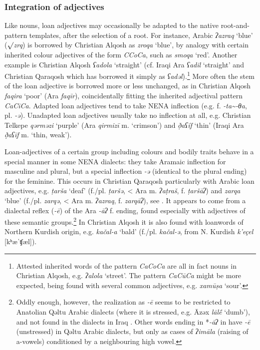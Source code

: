\documentclass[output=paper]{langsci/langscibook}
\begin{document}
\subsubsection{Integration of adjectives}

Like nouns, loan adjectives may occasionally be adapted to the native root-and-pattern templates, after the selection of a root. For instance, Arabic \textit{ʔazraq} ‘blue’ (${\surd}$\textit{zrq}) is borrowed by Christian Alqosh as \textit{zroqa} ‘blue’, by analogy with certain inherited colour adjectives of the form \textit{CCoCa}, such as \textit{smoqa} ‘red’. Another example is Christian Alqosh \textit{ʕadola} ‘straight’ (cf. Iraqi Ara \textit{ʕadil} ‘straight’ and Christian Qaraqosh which has borrowed it simply as \textit{ʕadəl}).\footnote{Attested inherited words of the pattern \textit{CaCoCa} are all in fact nouns in Christian Alqosh, e.g. \textit{ʔalola} ‘street’. The pattern \textit{CaCūCa} might be more expected, being found with several common adjectives, e.g. \textit{xamūṣa} ‘sour’.} More often the stem of the loan adjective is borrowed more or less unchanged, as in Christian Alqosh \textit{faqira} ‘poor’ (Ara \textit{faqīr}), coincidentally fitting the inherited adjectival pattern \textit{CaCīCa}. Adapted loan adjectives tend to take NENA inflection (e.g. f. \textit{{}-ta{\textasciitilde}-θa}, pl. \textit{{}-ə}). Unadapted loan adjectives usually take no inflection at all, e.g. Christian Telkepe \textit{qərməzi} ‘purple’ (Ara \textit{qirmizī} m. ‘crimson’) and \textit{ð̣aʕíf} ‘thin’ (Iraqi Ara \textit{ð̣aʕīf} m. ‘thin, weak’).

Loan-adjectives of a certain group including colours and bodily traits behave in a special manner in some NENA dialects: they take Aramaic inflection for masculine and plural, but a special inflection \textit{\nobreakdash-ə} (identical to the plural ending) for the feminine. This occurs in Christian Qaraqosh particularly with Arabic loan adjectives, e.g. \textit{ṭarša} ‘deaf’ (f./pl. \textit{ṭaršə}, < Ara m. \textit{ʔaṭraš}, f. \textit{ṭaršāʔ}) and \textit{zarqa} ‘blue’ (f./pl. \textit{zarqə}, < Ara m. \textit{ʔazraq}, f. \textit{zarqāʔ}), see \citet[219]{Khan2002}. It appears to come from a dialectal reflex (\textit{\nobreakdash-ē}) of the Ara \textit{\nobreakdash-āʔ} f. ending, found especially with adjectives of these semantic groups.\footnote{Oddly enough, however, the realization as \textit{{}-ē} seems to be restricted to Anatolian Qəltu Arabic dialects (where it is stressed, e.g. Āzəx \textit{lāl\'{ē}} ‘dumb’), and not found in the dialects in Iraq \citep[76]{Jastrow1978}. Other words ending in *\textit{{}-āʔ} in have \textit{{}-ē} (unstressed) in Qəltu Arabic dialects, but only as cases of \textit{ʔimāla} (raising of a-vowels) conditioned by a neighbouring high vowel.}  In Christian Alqosh it is also found with loanwords of Northern Kurdish origin, e.g. \textit{kačal-a} ‘bald’ (f./pl. \textit{kačal\nobreakdash-ə}, from N. Kurdish \textit{k’eçel} [kʰæˈʧæl]).
\end{document}
